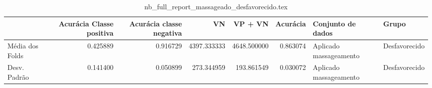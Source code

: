 \begin{table}
\centering
\caption{nb_full_report_massageado_desfavorecido.tex}
\label{nb_full_report_massageado_desfavorecido.tex}
\begin{tabular}{lrrrrrll}
\toprule
{}              &  Acurácia Classe positiva &  Acurácia classe negativa &          VN  &     VP + VN  &  Acurácia &       Conjunto de dados &          Grupo \\
\midrule
Média dos Folds &                  0.425889 &                  0.916729 &  4397.333333 &  4648.500000 &  0.863074 &  Aplicado massageamento &  Desfavorecido \\
Desv. Padrão    &                  0.141400 &                  0.050899 &   273.344959 &   193.861549 &  0.030072 &  Aplicado massageamento &  Desfavorecido \\
\bottomrule
\end{tabular}
\end{table}
